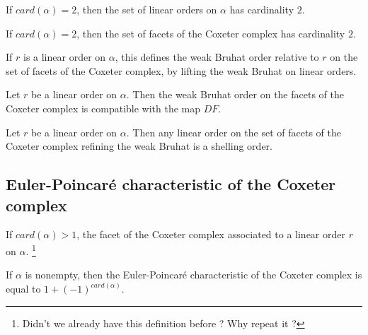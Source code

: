 \begin{sublemma}
If $card(\alpha)=2$, then the set of linear orders on $\alpha$ has cardinality $2$.

\end{sublemma}

\begin{sublemma}
If $card(\alpha)=2$, then the set of facets of the Coxeter complex has cardinality $2$.

\end{sublemma}

\begin{subdefi}
If $r$ is a linear order on $\alpha$, this defines the weak Bruhat order relative to $r$ on the set of facets of the Coxeter complex, by lifting the
weak Bruhat on linear orders.

\end{subdefi}

\begin{sublemma}
Let $r$ be a linear order on $\alpha$. Then the weak Bruhat order on the facets of the Coxeter complex is compatible with the map $DF$.

\end{sublemma}

\begin{sublemma}
Let $r$ be a linear order on $\alpha$. Then any linear order on the set of facets of the Coxeter complex refining the weak Bruhat is a shelling order.

\end{sublemma}


\subsection{Euler-Poincaré characteristic of the Coxeter complex}

\begin{subdefi}[FacetofLinearOrder]
If $card(\alpha)>1$, the facet of the Coxeter complex associated to a linear order $r$ on $\alpha$.
\footnote{Didn't we already have this definition before ? Why repeat it ?}

\end{subdefi}

\begin{sublemma}
If $\alpha$ is nonempty, then the Euler-Poincaré characteristic of the Coxeter complex is equal to $1+(-1)^{card(\alpha)}$.

\end{sublemma}

